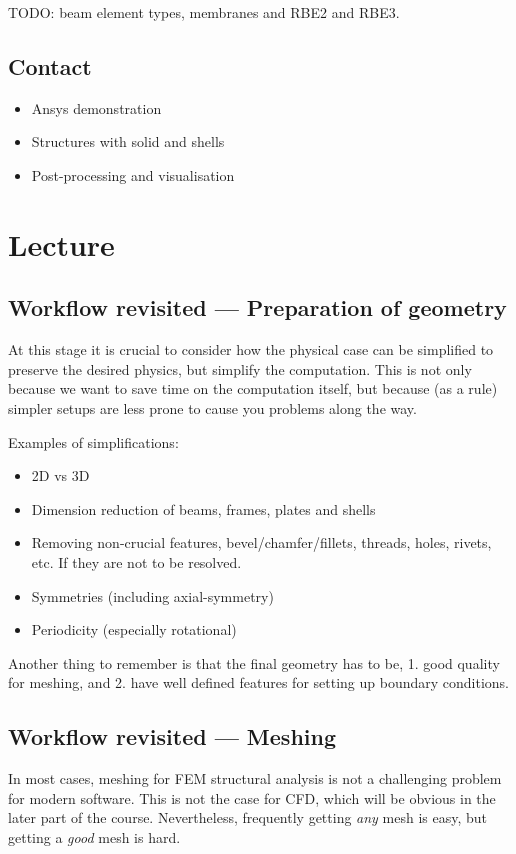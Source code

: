 \documentclass[12pt]{article}
\begin{document}
TODO: beam element types, membranes and RBE2 and RBE3.

\newpage


\subsection*{Contact}
\begin{itemize}
    \item Ansys demonstration
    \item Structures with solid and shells
    \item Post-processing and visualisation
\end{itemize}
\section{Lecture}
\subsection{Workflow revisited --- Preparation of geometry}
At this stage it is crucial to consider how the physical case can be simplified to preserve the desired physics, but simplify the computation. This is not only because we want to save time on the computation itself, but because (as a rule) simpler setups are less prone to cause you problems along the way.

Examples of simplifications:
\begin{itemize}
    \item 2D vs 3D
    \item Dimension reduction of beams, frames, plates and shells
    \item Removing non-crucial features, bevel/chamfer/fillets, threads, holes, rivets, etc. If they are not to be resolved.
    \item Symmetries (including axial-symmetry)
    \item Periodicity (especially rotational)
\end{itemize}

Another thing to remember is that the final geometry has to be, 1. good quality for meshing, and 2. have well defined features for setting up boundary conditions.

\subsection{Workflow revisited --- Meshing}
In most cases, meshing for FEM structural analysis is not a challenging problem for modern software. This is not the case for CFD, which will be obvious in the later part of the course. Nevertheless, frequently getting {\it any} mesh is easy, but getting a {\it good} mesh is hard.
\end{document}
